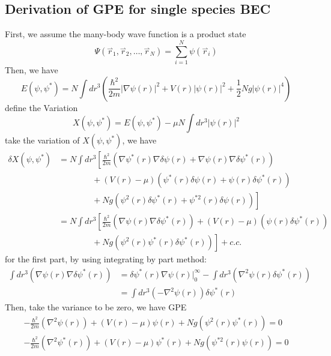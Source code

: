 \subsection{Derivation of GPE for single species BEC}

First, we assume the many-body wave function is a product state
\begin{equation}
\Psi \left(\overset{\rightharpoonup }{r}_1,\overset{\rightharpoonup }{r}_2,\ldots  ,\overset{\rightharpoonup }{r}_N\right)=\sum _{i=1}^N \psi \left(\overset{\rightharpoonup}{r}_i\right)
\end{equation}
Then, we have
\begin{equation}
E\left(\psi ,\psi ^*\right)=N\int dr^3\left(\frac{\hbar ^2}{2m}\left| \nabla \psi (r)\right| ^2+V(r)\left| \psi (r)\right| ^2+\frac{1}{2}N g\left|\psi (r)\right| ^4\right)
\end{equation}
define the Variation
\begin{equation}
X\left(\psi ,\psi ^*\right)=E\left(\psi ,\psi ^*\right)-\mu  N\int dr^3\left| \psi (r)\right| ^2
\end{equation}
take the variation of $X\left(\psi ,\psi ^*\right)$, we have
\begin{equation}
\begin{split}
\delta  X\left(\psi ,\psi ^*\right)&=N\int dr^3\left[\frac{\hbar ^2}{2m}\left(\nabla \psi ^*(r)\nabla \delta \psi (r)+\nabla \psi (r)\nabla \delta \psi ^*(r)\right)\right.\\
&\left.\qquad\qquad+(V(r)-\mu )\left(\psi ^*(r)\delta  \psi (r)+\psi (r)\delta  \psi ^*(r) \right)\right.\\
&\left.\qquad\qquad+N g\left(\psi ^2(r)\delta  \psi ^*(r)+\psi ^{*2}(r)\delta\psi (r)\right)\right]\\
&=N\int dr^3\left[\frac{\hbar ^2}{2m}\left(\nabla \psi (r)\nabla \delta \psi ^*(r)\right)+(V(r)-\mu )\left(\psi (r)\delta  \psi ^*(r) \right)\right.\\
&\left.\qquad\qquad+N g\left(\psi^2(r)\psi ^*(r)\delta  \psi ^*(r)\right)\right]+c.c.
\end{split}
\end{equation}
for the first part, by using integrating by part method:
\begin{equation}
\begin{split}
\int dr^3\left(\nabla \psi (r)\nabla \delta \psi ^*(r)\right)&=\delta \psi ^*(r)\nabla \psi (r)|_0^{\infty }-\int dr^3\left(\nabla ^2\psi (r)\delta
\psi ^*(r)\right)\\
&=\int dr^3\left(-\nabla ^2\psi (r)\right)\delta \psi ^*(r)
\end{split}
\end{equation}
Then, take the variance to be zero, we have GPE
\begin{equation}
\begin{split}
-\frac{\hbar ^2}{2m}\left(\nabla ^2\psi (r)\right)+(V(r)-\mu )\psi (r)+N g\left(\psi ^2(r)\psi ^*(r)\right)=0\\
-\frac{\hbar ^2}{2m}\left(\nabla^2\psi^*(r)\right)+(V(r)-\mu)\psi ^*(r)+N g\left(\psi ^{*2}(r)\psi (r)\right)=0
\end{split}
\end{equation}


